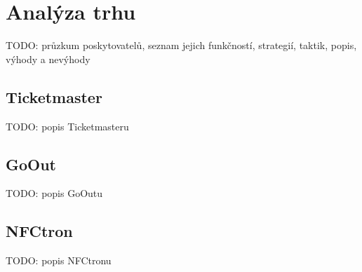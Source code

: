 \chapter{Analýza trhu}
\label{chap:analyza-trhu}
TODO: průzkum poskytovatelů, seznam jejich funkčností, strategií, taktik, popis, výhody a nevýhody

\section{Ticketmaster}
\label{sec:analyza-trhu-ticketmaster}
TODO: popis Ticketmasteru

\section{GoOut}
\label{sec:analyza-trhu-goout}
TODO: popis GoOutu

\section{NFCtron}
\label{sec:analyza-trhu-nfctron}
TODO: popis NFCtronu
